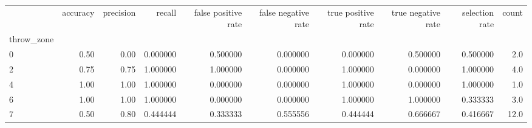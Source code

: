 \begin{tabular}{lrrrrrrrrr}
\toprule
{} &  accuracy &  precision &    recall &  false positive rate &  false negative rate &  true positive rate &  true negative rate &  selection rate &  count \\
throw\_zone &           &            &           &                      &                      &                     &                     &                 &        \\
\midrule
0          &      0.50 &       0.00 &  0.000000 &             0.500000 &             0.000000 &            0.000000 &            0.500000 &        0.500000 &    2.0 \\
2          &      0.75 &       0.75 &  1.000000 &             1.000000 &             0.000000 &            1.000000 &            0.000000 &        1.000000 &    4.0 \\
4          &      1.00 &       1.00 &  1.000000 &             0.000000 &             0.000000 &            1.000000 &            0.000000 &        1.000000 &    1.0 \\
6          &      1.00 &       1.00 &  1.000000 &             0.000000 &             0.000000 &            1.000000 &            1.000000 &        0.333333 &    3.0 \\
7          &      0.50 &       0.80 &  0.444444 &             0.333333 &             0.555556 &            0.444444 &            0.666667 &        0.416667 &   12.0 \\
\bottomrule
\end{tabular}
